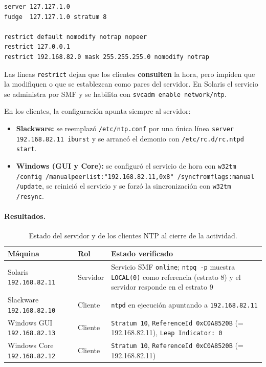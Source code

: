 \documentclass[11pt,a4paper]{report}
\begin{document}
\begin{verbatim}
server 127.127.1.0
fudge  127.127.1.0 stratum 8

restrict default nomodify notrap nopeer
restrict 127.0.0.1
restrict 192.168.82.0 mask 255.255.255.0 nomodify notrap
\end{verbatim}

Las líneas \texttt{restrict} dejan que los clientes \textbf{consulten} la hora,
pero impiden que la modifiquen o que se establezcan como pares del servidor. En
Solaris el servicio se administra por SMF y se habilita con
\texttt{svcadm enable network/ntp}.

En los clientes, la configuración apunta siempre al servidor:

\begin{itemize}
  \item \textbf{Slackware:} se reemplazó \texttt{/etc/ntp.conf} por una única línea
        \texttt{server 192.168.82.11 iburst} y se arrancó el demonio con
        \texttt{/etc/rc.d/rc.ntpd start}.
  \item \textbf{Windows (GUI y Core):} se configuró el servicio de hora con
        \texttt{w32tm /config /manualpeerlist:"192.168.82.11,0x8"
        /syncfromflags:manual /update}, se reinició el servicio y se forzó la
        sincronización con \texttt{w32tm /resync}.
\end{itemize}

\paragraph{Resultados.}

\begin{table}[H]
  \centering
  \begin{tabularx}{\linewidth}{@{}llX@{}}
    \toprule
    \textbf{Máquina} & \textbf{Rol} & \textbf{Estado verificado} \\
    \midrule
    Solaris \texttt{192.168.82.11} & Servidor & Servicio SMF \texttt{online}; \texttt{ntpq -p} muestra \texttt{LOCAL(0)} como referencia (estrato 8) y el servidor responde en el estrato 9 \\
    Slackware \texttt{192.168.82.10} & Cliente & \texttt{ntpd} en ejecución apuntando a \texttt{192.168.82.11} \\
    Windows GUI \texttt{192.168.82.13} & Cliente & \texttt{Stratum 10}, \texttt{ReferenceId 0xC0A8520B} (= 192.168.82.11), \texttt{Leap Indicator: 0} \\
    Windows Core \texttt{192.168.82.12} & Cliente & \texttt{Stratum 10}, \texttt{ReferenceId 0xC0A8520B} (= 192.168.82.11) \\
    \bottomrule
  \end{tabularx}
  \caption{Estado del servidor y de los clientes NTP al cierre de la actividad.}
\end{table}
\end{document}
